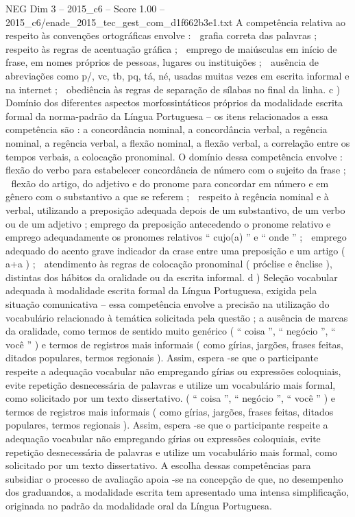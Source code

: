 \begin{textsample}{NEG Dim 3 – 2015\_c6 – Score 1.00 – 2015\_c6/enade\_2015\_tec\_gest\_com\_d1f662b3e1.txt}
A competência relativa ao respeito às convenções ortográficas envolve :  grafia correta das palavras ;  respeito às regras de acentuação gráfica ;  emprego de maiúsculas em início de frase, em nomes próprios de pessoas, lugares ou instituições ;  ausência de abreviações como p/, vc, tb, pq, tá, né, usadas muitas vezes em escrita informal e na internet ;  obediência às regras de separação de sílabas no final da linha. c ) Domínio dos diferentes aspectos morfossintáticos próprios da modalidade escrita formal da norma-padrão da Língua Portuguesa – os itens relacionados a essa competência são : a concordância nominal, a concordância verbal, a regência nominal, a regência verbal, a flexão nominal, a flexão verbal, a correlação entre os tempos verbais, a colocação pronominal.
O domínio dessa competência envolve :  flexão do verbo para estabelecer concordância de número com o sujeito da frase ;  flexão do artigo, do adjetivo e do pronome para concordar em número e em gênero com o substantivo a que se referem ;  respeito à regência nominal e à verbal, utilizando a preposição adequada depois de um substantivo, de um verbo ou de um adjetivo ; emprego da preposição antecedendo o pronome relativo e emprego adequadamente os pronomes relativos “ cujo(a) ” e “ onde ” ;  emprego adequado do acento grave indicador da crase entre uma preposição e um artigo ( a+a ) ;  atendimento às regras de colocação pronominal ( próclise e ênclise ), distintas dos hábitos da oralidade ou da escrita informal. d ) Seleção vocabular adequada à modalidade escrita formal da Língua Portuguesa, exigida pela situação comunicativa – essa competência envolve a precisão na utilização do vocabulário relacionado à temática solicitada pela questão ; a ausência de marcas da oralidade, como termos de sentido muito genérico ( “ coisa ”, “ negócio ”, “ você ” ) e termos de registros mais informais ( como gírias, jargões, frases feitas, ditados populares, termos regionais ).
Assim, espera -se que o participante respeite a adequação vocabular não empregando gírias ou expressões coloquiais, evite repetição desnecessária de palavras e utilize um vocabulário mais formal, como solicitado por um texto dissertativo. ( “ coisa ”, “ negócio ”, “ você ” ) e termos de registros mais informais ( como gírias, jargões, frases feitas, ditados populares, termos regionais ).
Assim, espera -se que o participante respeite a adequação vocabular não empregando gírias ou expressões coloquiais, evite repetição desnecessária de palavras e utilize um vocabulário mais formal, como solicitado por um texto dissertativo.
A escolha dessas competências para subsidiar o processo de avaliação apoia -se na concepção de que, no desempenho dos graduandos, a modalidade escrita tem apresentado uma intensa simplificação, originada no padrão da modalidade oral da Língua Portuguesa.

\end{textsample}
